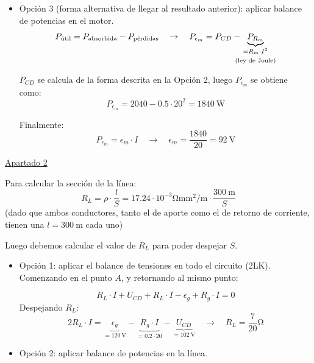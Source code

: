 \begin{example}
\begin{itemize}
  \item Opción 3 (forma alternativa de llegar al resultado anterior):
    aplicar balance de potencias en el motor.
    \[
      P_{\textrm{útil}} = P_{\textrm{absorbida}} -
      P_{\textrm{pérdidas}} \quad \rightarrow \quad P_{\epsilon_m} =
      P_{CD} - \hspace{-3mm} \underbrace{P_{R_m}}_{\substack{= R_m
          \cdot I^2 \\[3pt] \text{(ley de Joule)}}}
    \]
    
    $P_{CD}$ se calcula de la forma descrita en la Opción 2, luego
    $P_{\epsilon_m}$ se obtiene como:
    \[
      P_{\epsilon_m} = 2040 - 0.5 \cdot 20^2 = \qty{1840}{\watt}
    \]

    Finalmente:
    \[
      P_{\epsilon_m} = \epsilon_m \cdot I \quad \rightarrow \quad
      \epsilon_m = \frac{1840}{20} = \boxed{ \qty{92}{\volt} }
    \]
  \end{itemize}

  \vspace{3mm}

  \underline{Apartado 2}

  \vspace{5mm}

  Para calcular la sección de la línea:
  \[
    R_L = \rho \cdot \frac{l}{S} = {17.24 \cdot
      10^{-3}}\si{\ohm\milli\meter\squared\per\meter} \cdot
    \frac{\qty{300}{\meter}}{S}
  \]
  (dado que ambos conductores, tanto el de aporte como el de retorno
  de corriente, tienen una $l=\qty{300}{\meter}$ cada uno)

  \vspace{3mm} Luego debemos calcular el valor de $R_L$ para poder
  despejar $S$.
  \begin{itemize}
  \item Opción 1: aplicar el balance de tensiones en todo el circuito
    (2LK). Comenzando en el punto $A$, y retornando al mismo punto:
    
    \[
      R_L \cdot I + U_{CD} + R_L \cdot I - \epsilon_g + R_g \cdot I =
      0
    \]
    Despejando $R_L$:
    \[
      2 R_L \cdot I = \underbrace{\epsilon_g}_{=\qty{120}{\volt}} -
      \underbrace{R_g \cdot I}_{=0.2 \cdot 20} -
      \underbrace{U_{CD}}_{=\qty{102}{\volt}} \quad \rightarrow \quad
      \boxed{ R_L = {\frac{7}{20}}\si{\ohm} }
    \]

  \item Opción 2: aplicar balance de potencias en la línea.


\end{itemize}
\end{example}
